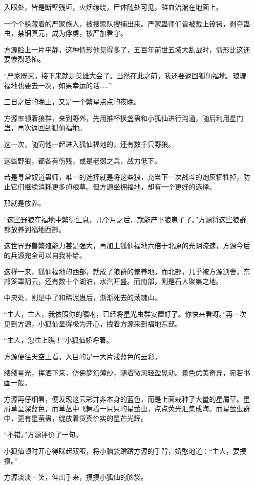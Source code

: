 \begin{this_body}
入眼处，皆是断壁残垣，火烟缭绕，尸体随处可见，鲜血流淌在地面上。

一个个躲藏着的严家族人，被搜索队搜捕出来。严家蛊师们皆被戴上镣铐，剥夺蛊虫，禁锢真元，成为俘虏，被严加看守。

方源脸上一片平静，这种情形他见得多了，五百年前世五域大乱战时，情形比这还要惨烈恐怖。

“严家既灭，接下来就是英雄大会了。当然在此之前，我还要返回狐仙福地。琅琊福地也要去一次，如果幸运的话……”

三日之后的晚上，又是一个繁星点点的夜晚。

方源率领着狼群，来到野外，先用推杯换盏蛊和小狐仙进行沟通，随后利用星门蛊，再次返回到狐仙福地。

这一次，随同他一起进入狐仙福地的，还有数千只野狼。

这些野狼，都各有伤残，或是老弱之兵，战力低下。

若是寻常奴道蛊师，唯一的选择就是将这些狼，充当下一次战斗的炮灰牺牲掉，防止它们继续消耗更多的粮草。但方源坐拥福地，却有一个更好的选择。

那就是放养。

“这些野狼在福地中繁衍生息，几个月之后，就能产下狼崽子了。”方源将这些狼群都放养到福地西部。

这世界野兽繁殖能力甚是强大，再加上狐仙福地六倍于北原的光阴流速，方源今后的兵源完全可以自我补给。

这样一来，狐仙福地的西部，就成了狼群的豢养地。而北部，几乎被方源割舍。东部笼罩阴云，还有数十个湖泊，水汽旺盛。而南部，则是石人聚集之地。

中央处，则是中了和稀泥蛊后，渐渐死去的荡魂山。

“主人，主人，我依照你的嘱咐，已经将星光虫群安置好了。你快来看呀。”再一次见到方源，小狐仙显得极为开心，拽着方源来到福地东部。

“主人，您往上瞧！”小狐仙娇呼着。

方源便往天空上看，入目的是一大片浅蓝色的云彩。

缕缕星光，挥洒下来，仿佛梦幻薄纱，随着微风轻盈晃动。景色优美奇异，宛若书画一般。

方源再仔细看，便发现这云彩并非本身的蓝色，而是上面栽种了大量的星屑草。星屑草呈深蓝色，而草丛中飞舞着一只只的星萤虫，点点荧光汇集成海。而星萤虫群中，更有星萤蛊，绽放着货真价实的星芒光辉。

“不错。”方源评价了一句。

小狐仙顿时开心得眯起双眼，将小脑袋蹭蹭方源的手背，娇憨地道：“主人，要摸摸。”

方源淡淡一笑，伸出手来，摸摸小狐仙的脑袋。


\end{this_body}
